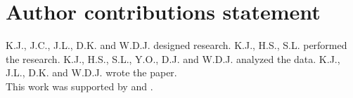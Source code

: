 \section*{Author contributions statement}

K.J., J.C., J.L., D.K. and W.D.J. designed research.
K.J., H.S., S.L. performed the research.
K.J., H.S., S.L., Y.O., D.J. and W.D.J. analyzed the data.
K.J., J.L., D.K. and W.D.J. wrote the paper.
\\
This work was supported by  and .



  